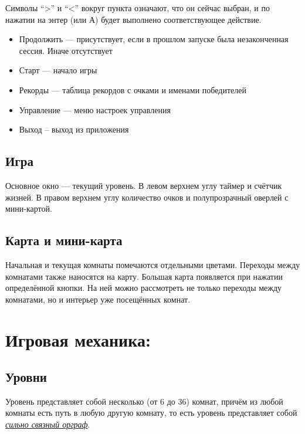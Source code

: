 \documentclass[12pt,a4paper,fullpage]{article}
\begin{document}

Символы ``>'' и ``<'' вокруг пункта означают, что он сейчас выбран, и по нажатии на энтер (или А) будет выполнено соответствующее действие.

\begin{itemize}
\item Продолжить --- присутствует, если в прошлом запуске была незаконченная сессия. Иначе отсутствует
\item Старт --- начало игры
\item Рекорды --- таблица рекордов с очками и именами победителей
\item Управление --- меню настроек управления
\item Выход -- выход из приложения\\
\end{itemize}

\subsection{Игра}

Основное окно --- текущий уровень. В левом верхнем углу таймер и счётчик жизней. В правом верхнем углу количество очков и полупрозрачный оверлей с мини-картой.\\

\subsection{Карта и мини-карта}
Начальная и текущая комнаты помечаются отдельными цветами. Переходы между комнатами также наносятся на карту.
Большая карта появляется при нажатии определённой кнопки. На ней можно рассмотреть не только переходы между комнатами, но и интерьер уже посещённых комнат.\\


\section{Игровая механика:}
\subsection{Уровни}
Уровень представляет собой несколько (от 6 до 36) комнат, причём из любой комнаты есть путь в любую другую комнату, то есть уровень представляет собой \href{http://ru.wikipedia.org/wiki/%
}{\textit{сильно связный орграф}}.
\end{document}

